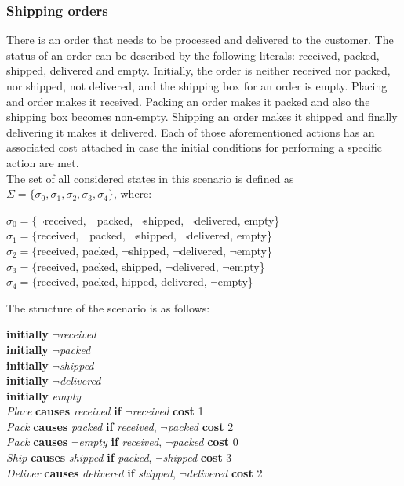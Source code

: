 \documentclass[a4paper]{article}
\begin{document}
\subsubsection{Shipping orders}
There is an order that needs to be processed and delivered to the customer. The status of an order can be described by the following literals: received, packed, shipped, delivered and empty. Initially, the order is neither received nor packed, nor shipped, not delivered, and the shipping box for an order is empty.  Placing and order makes it received. Packing an order makes it packed and also the shipping box becomes non-empty. Shipping an order makes it shipped and finally delivering it makes it delivered. Each of those aforementioned actions has an associated cost attached in case the initial conditions for performing a specific action are met. \\
The set of all considered states in this scenario is defined as $\Sigma = \{{\sigma_0, \sigma_1, \sigma_2, \sigma_3, \sigma_4\}}$, where:
\begin{center}
$\sigma_0 = \{${$\neg$received, $\neg$packed, $\neg$shipped, $\neg$delivered, empty}\} \\[0.1\baselineskip]
$\sigma_1 = \{${received, $\neg$packed, $\neg$shipped, $\neg$delivered, empty}\} \\[0.1\baselineskip]
$\sigma_2 = \{${received, packed, $\neg$shipped, $\neg$delivered, $\neg$empty}\} \\[0.1\baselineskip]
$\sigma_3 = \{${received, packed, shipped, $\neg$delivered, $\neg$empty}\} \\[0.1\baselineskip]
$\sigma_4 = \{${received, packed, hipped, delivered, $\neg$empty}\}
\end{center}
The structure of the scenario is as follows:
\begin{center}
\textbf{initially} $\neg$\textit{received} \\[0.1\baselineskip]
\textbf{initially} $\neg$\textit{packed} \\[0.1\baselineskip]
\textbf{initially} $\neg$\textit{shipped} \\[0.1\baselineskip]
\textbf{initially} $\neg$\textit{delivered} \\[0.1\baselineskip]
\textbf{initially} \textit{empty} \\[0.5\baselineskip]
\textit{Place} \textbf{causes} \textit{received} \textbf{if} $\neg$\textit{received} \textbf{cost} 1 \\[0.1\baselineskip]
\textit{Pack} \textbf{causes} \textit{packed} \textbf{if} \textit{received}, $\neg$\textit{packed} \textbf{cost} 2 \\[0.1\baselineskip]
\textit{Pack} \textbf{causes} $\neg$\textit{empty} \textbf{if} \textit{received}, $\neg$\textit{packed} \textbf{cost} 0 \\[0.1\baselineskip]
\textit{Ship} \textbf{causes} \textit{shipped} \textbf{if} \textit{packed}, $\neg$\textit{shipped} \textbf{cost} 3 \\[0.1\baselineskip]
\textit{Deliver} \textbf{causes} \textit{delivered} \textbf{if} \textit{shipped}, $\neg$\textit{delivered} \textbf{cost} 2 \\[0.5\baselineskip]
\end{center}
\end{document}
